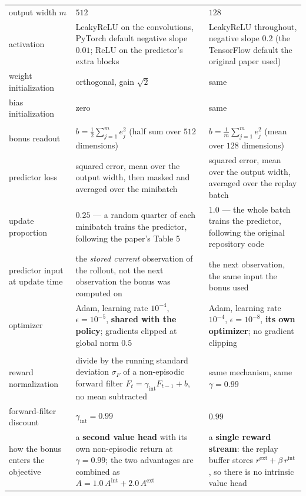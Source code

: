 \begin{table}[H]
{\begin{tabular}{@{}>{\raggedright\arraybackslash}p{3.4cm}
>{\raggedright\arraybackslash}p{5.6cm}
>{\raggedright\arraybackslash}p{5.6cm}@{}}
output width $m$ & $512$ & $128$ \\
activation & LeakyReLU on the convolutions, PyTorch default negative slope $0.01$; ReLU on the
  predictor's extra blocks & LeakyReLU throughout, negative slope $0.2$ (the TensorFlow default the
  original paper used) \\
weight initialization & orthogonal, gain $\sqrt2$ & same \\
bias initialization & zero & same \\
\midrule
\multicolumn{3}{@{}l}{\textit{Readout and predictor training}} \\
bonus readout & $b = \tfrac12\sum_{j=1}^{m} e_j^2$ (half sum over $512$ dimensions) & $b =
  \tfrac1m\sum_{j=1}^{m} e_j^2$ (mean over $128$ dimensions) \\
predictor loss & squared error, mean over the output width, then masked and averaged over the
  minibatch & squared error, mean over the output width, averaged over the replay batch \\
update proportion & $0.25$ --- a random quarter of each minibatch trains the predictor, following
  the paper's Table 5 & $1.0$ --- the whole batch trains the predictor, following the original
  repository code \\
predictor input at update time & the \emph{stored current} observation of the rollout, not the next
  observation the bonus was computed on & the next observation, the same input the bonus used \\
optimizer & Adam, learning rate $10^{-4}$, $\epsilon = 10^{-5}$, \textbf{shared with the policy};
  gradients clipped at global norm $0.5$ & Adam, learning rate $10^{-4}$, $\epsilon = 10^{-8}$,
  \textbf{its own optimizer}; no gradient clipping \\
\midrule
\multicolumn{3}{@{}l}{\textit{Intrinsic reward}} \\
reward normalization & divide by the running standard deviation $\sigma_F$ of a non-episodic forward
  filter $F_t = \gamma_{\mathrm{int}} F_{t-1} + b$, no mean subtracted & same mechanism, same
  $\gamma = 0.99$ \\
forward-filter discount & $\gamma_{\mathrm{int}} = 0.99$ & $0.99$ \\
how the bonus enters the objective & a \textbf{second value head} with its own non-episodic return
  at $\gamma = 0.99$; the two advantages are combined as $A = 1.0\,A^{\mathrm{int}} +
  2.0\,A^{\mathrm{ext}}$ & a \textbf{single reward stream}: the replay buffer stores $r^{\mathrm{ext}}
  + \beta\,r^{\mathrm{int}}$, so there is no intrinsic value head \\

\end{tabular}}
\end{table}
